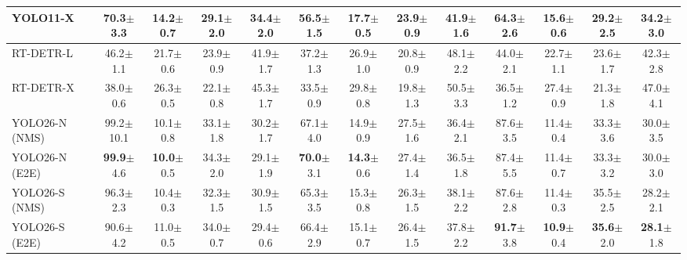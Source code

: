 \begin{table}[!thb]
{\begin{tabular}{lcccccccccccc}
YOLO11-X       & 70.3{\scriptsize$\pm$3.3} & 14.2{\scriptsize$\pm$0.7} & 29.1{\scriptsize$\pm$2.0} & 34.4{\scriptsize$\pm$2.0} & 56.5{\scriptsize$\pm$1.5} & 17.7{\scriptsize$\pm$0.5} & 23.9{\scriptsize$\pm$0.9} & 41.9{\scriptsize$\pm$1.6} & 64.3{\scriptsize$\pm$2.6} & 15.6{\scriptsize$\pm$0.6} & 29.2{\scriptsize$\pm$2.5} & 34.2{\scriptsize$\pm$3.0} \\
\midrule
RT-DETR-L      & 46.2{\scriptsize$\pm$1.1} & 21.7{\scriptsize$\pm$0.6} & 23.9{\scriptsize$\pm$0.9} & 41.9{\scriptsize$\pm$1.7} & 37.2{\scriptsize$\pm$1.3} & 26.9{\scriptsize$\pm$1.0} & 20.8{\scriptsize$\pm$0.9} & 48.1{\scriptsize$\pm$2.2} & 44.0{\scriptsize$\pm$2.1} & 22.7{\scriptsize$\pm$1.1} & 23.6{\scriptsize$\pm$1.7} & 42.3{\scriptsize$\pm$2.8} \\
RT-DETR-X      & 38.0{\scriptsize$\pm$0.6} & 26.3{\scriptsize$\pm$0.5} & 22.1{\scriptsize$\pm$0.8} & 45.3{\scriptsize$\pm$1.7} & 33.5{\scriptsize$\pm$0.9} & 29.8{\scriptsize$\pm$0.8} & 19.8{\scriptsize$\pm$1.3} & 50.5{\scriptsize$\pm$3.3} & 36.5{\scriptsize$\pm$1.2} & 27.4{\scriptsize$\pm$0.9} & 21.3{\scriptsize$\pm$1.8} & 47.0{\scriptsize$\pm$4.1} \\
\midrule
YOLO26-N (NMS) & 99.2{\scriptsize$\pm$10.1} & 10.1{\scriptsize$\pm$0.8} & 33.1{\scriptsize$\pm$1.8} & 30.2{\scriptsize$\pm$1.7} & 67.1{\scriptsize$\pm$4.0} & 14.9{\scriptsize$\pm$0.9} & 27.5{\scriptsize$\pm$1.6} & 36.4{\scriptsize$\pm$2.1} & 87.6{\scriptsize$\pm$3.5} & 11.4{\scriptsize$\pm$0.4} & 33.3{\scriptsize$\pm$3.6} & 30.0{\scriptsize$\pm$3.5} \\
YOLO26-N (E2E) & \textbf{99.9}{\scriptsize$\pm$4.6} & \textbf{10.0}{\scriptsize$\pm$0.5} & 34.3{\scriptsize$\pm$2.0} & 29.1{\scriptsize$\pm$1.9} & \textbf{70.0}{\scriptsize$\pm$3.1} & \textbf{14.3}{\scriptsize$\pm$0.6} & 27.4{\scriptsize$\pm$1.4} & 36.5{\scriptsize$\pm$1.8} & 87.4{\scriptsize$\pm$5.5} & 11.4{\scriptsize$\pm$0.7} & 33.3{\scriptsize$\pm$3.2} & 30.0{\scriptsize$\pm$3.0} \\
YOLO26-S (NMS) & 96.3{\scriptsize$\pm$2.3} & 10.4{\scriptsize$\pm$0.3} & 32.3{\scriptsize$\pm$1.5} & 30.9{\scriptsize$\pm$1.5} & 65.3{\scriptsize$\pm$3.5} & 15.3{\scriptsize$\pm$0.8} & 26.3{\scriptsize$\pm$1.5} & 38.1{\scriptsize$\pm$2.2} & 87.6{\scriptsize$\pm$2.8} & 11.4{\scriptsize$\pm$0.3} & 35.5{\scriptsize$\pm$2.5} & 28.2{\scriptsize$\pm$2.1} \\
YOLO26-S (E2E) & 90.6{\scriptsize$\pm$4.2} & 11.0{\scriptsize$\pm$0.5} & 34.0{\scriptsize$\pm$0.7} & 29.4{\scriptsize$\pm$0.6} & 66.4{\scriptsize$\pm$2.9} & 15.1{\scriptsize$\pm$0.7} & 26.4{\scriptsize$\pm$1.5} & 37.8{\scriptsize$\pm$2.2} & \textbf{91.7}{\scriptsize$\pm$3.8} & \textbf{10.9}{\scriptsize$\pm$0.4} & \textbf{35.6}{\scriptsize$\pm$2.0} & \textbf{28.1}{\scriptsize$\pm$1.8} \\

\end{tabular}}
\end{table}
